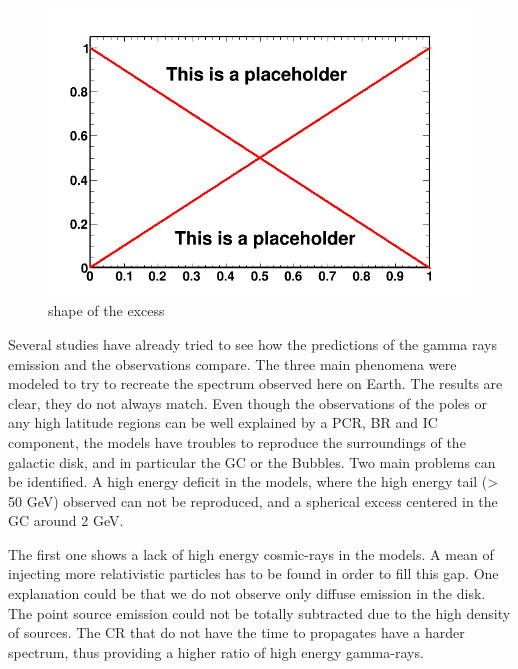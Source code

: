 \begin{figure}
 \centering
 \includegraphics[width=.9\linewidth]{pic/dummy.png}
 \caption{shape of the excess}
 \label{fig:first_BKGonly_fits}
\end{figure}

Several studies have already tried to see how the predictions of the gamma rays emission and the observations compare. The three main phenomena were modeled to try to recreate the spectrum observed here on Earth. The results are clear, they do not always match.
Even though the observations of the poles or any high latitude regions can be well explained by a PCR, BR and IC component, the models have troubles to reproduce the surroundings of the galactic disk, and in particular the GC or the Bubbles. 
Two main problems can be identified. A high energy deficit in the models, where the high energy tail (> 50 GeV) observed can not be reproduced, and a spherical excess centered in the GC around 2 GeV.

The first one shows a lack of high energy cosmic-rays in the models. A mean of injecting more relativistic particles has to be found in order to fill this gap. One explanation could be that we do not observe only diffuse emission in the disk. The point source emission could not be totally subtracted due to the high density of sources. The CR that do not have the time to propagates have a harder spectrum, thus providing a higher ratio of high energy gamma-rays.

